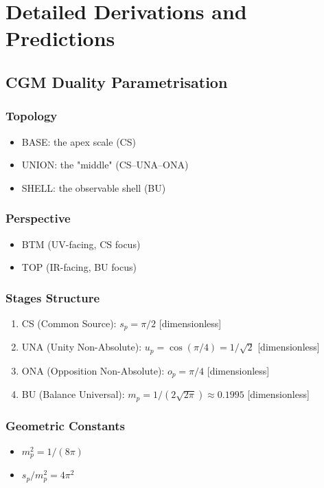 \documentclass[11pt,a4paper]{article}
\theoremstyle{definition}
\theoremstyle{remark}
\begin{document}
\appendix

\section{Detailed Derivations and Predictions}

\subsection{CGM Duality Parametrisation}

\subsubsection{Topology}
\begin{itemize}
\item BASE: the apex scale (CS)
\item UNION: the "middle" (CS--UNA--ONA)
\item SHELL: the observable shell (BU)
\end{itemize}

\subsubsection{Perspective}
\begin{itemize}
\item BTM (UV-facing, CS focus)
\item TOP (IR-facing, BU focus)
\end{itemize}

\subsubsection{Stages Structure}
\begin{enumerate}
\item CS (Common Source): $s_p = \pi/2$ [dimensionless]
\item UNA (Unity Non-Absolute): $u_p = \cos(\pi/4) = 1/\sqrt{2}$ [dimensionless]
\item ONA (Opposition Non-Absolute): $o_p = \pi/4$ [dimensionless]
\item BU (Balance Universal): $m_p = 1/(2\sqrt{2\pi}) \approx 0.1995$ [dimensionless]
\end{enumerate}

\subsubsection{Geometric Constants}
\begin{itemize}
\item $m_p^2 = 1/(8\pi)$
\item $s_p/m_p^2 = 4\pi^2$
\end{itemize}
\end{document}

